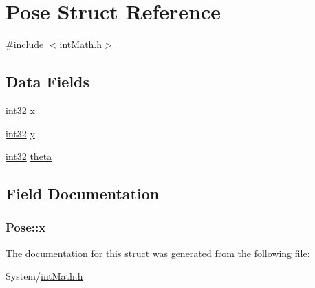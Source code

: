\hypertarget{struct_pose}{
\section{Pose Struct Reference}
\label{struct_pose}
}


{\ttfamily \#include $<$intMath.h$>$}

\subsection*{Data Fields}
\begin{DoxyCompactItemize}
\item 
\hyperlink{typedefs_8h_a4ca2d97e571b049be6f4cdcfaa1ab946}{int32} \hyperlink{struct_pose_ab5810770d2f2923cdfc2509f1678f4e9}{x}
\item 
\hyperlink{typedefs_8h_a4ca2d97e571b049be6f4cdcfaa1ab946}{int32} \hyperlink{group__kernel_ga20f888022a0508812913975f7dd93941}{y}
\item 
\hyperlink{typedefs_8h_a4ca2d97e571b049be6f4cdcfaa1ab946}{int32} \hyperlink{group__kernel_ga467683407d3364bc201d254c728b9389}{theta}
\end{DoxyCompactItemize}


\subsection{Field Documentation}
\hypertarget{struct_pose_ab5810770d2f2923cdfc2509f1678f4e9}{
\subsubsection[{x}]{ {\bf Pose::x}}}
\label{struct_pose_ab5810770d2f2923cdfc2509f1678f4e9}


The documentation for this struct was generated from the following file:\begin{DoxyCompactItemize}
\item 
System/\hyperlink{int_math_8h}{intMath.h}\end{DoxyCompactItemize}
